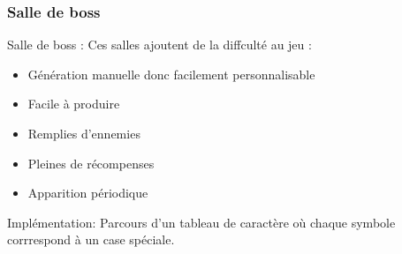 \documentclass[french]{beamer}
\begin{document}
\begin{frame}
\frametitle{Salle de boss}
\begin{block}{Salle de boss : }
Ces salles ajoutent de la diffculté au jeu :
\begin{itemize}
\item Génération manuelle donc facilement personnalisable
\item Facile à produire
\item Remplies d'ennemies
\item Pleines de récompenses
\item Apparition périodique
\end{itemize}
\end{block}

\begin{block}{Implémentation: }
Parcours d'un tableau de caractère où chaque symbole corrrespond à un case spéciale.\\ 
\end{block}

\end{frame}
\end{document}
